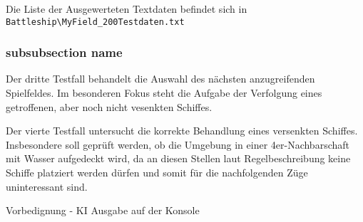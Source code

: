 		Die Liste der Ausgewerteten Textdaten befindet sich in \newline \texttt{Battleship\textbackslash MyField\_200Testdaten.txt}
	\subsubsection{subsubsection name} %
	\label{ssub:subsubsection_name}
	

	Der dritte Testfall behandelt die Auswahl des nächsten anzugreifenden Spielfeldes. Im besonderen Fokus steht die Aufgabe der Verfolgung eines 
	getroffenen, aber noch nicht vesenkten Schiffes.
	
	Der vierte Testfall untersucht die korrekte Behandlung eines versenkten Schiffes. Insbesondere soll geprüft werden, ob die Umgebung in einer 4er-Nachbarschaft
	mit Wasser aufgedeckt wird, da an diesen Stellen laut Regelbeschreibung keine Schiffe platziert werden dürfen und somit für die nachfolgenden Züge uninteressant sind.
	
	Vorbedignung - KI Ausgabe auf der Konsole
     
